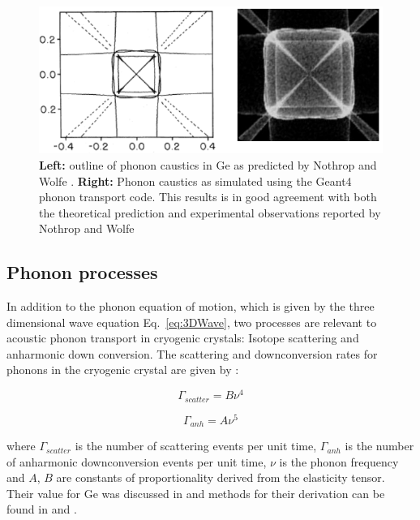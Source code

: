 \documentclass[preprint,12pt]{elsarticle}
\begin{document}
\begin{figure}
	\centering
		\includegraphics[width=1.00\textwidth]{caustics.png}
	\caption{\textbf{Left:} outline of phonon caustics in Ge as predicted by Nothrop and Wolfe \cite{Nothrop}. \textbf{Right:} Phonon caustics as simulated using the Geant4 phonon transport code. This results is in good agreement with both the theoretical prediction and experimental observations reported by Nothrop and Wolfe \cite{Nothrop} }
	\label{fig:caustics}
\end{figure}

\subsection{Phonon processes}
\label{sec:Processes}

In addition to the phonon equation of motion, which is given by the three dimensional wave equation Eq.~\ref{eq:3DWave}, two processes are relevant to acoustic phonon transport in cryogenic crystals: Isotope scattering and anharmonic down conversion\cite{Tamura1}\cite{Tamura2}\cite{Tamura3}. The scattering and downconversion rates for phonons in the cryogenic crystal are given by \cite{Tamura2}:

\begin{equation}
\label{eq:ScatterRate}
\Gamma_{scatter} = B\nu^4
\end{equation}

\begin{equation}
\label{eq:anhRate}
\Gamma_{anh} = A\nu^5
\end{equation}

where $\Gamma_{scatter}$ is the number of scattering events per unit time, $\Gamma_{anh}$ is the number of anharmonic downconversion events per unit time, $\nu$ is the phonon frequency and $A$, $B$ are constants of proportionality derived from the elasticity tensor. Their value for Ge was discussed in \cite{Brandt} and methods for their derivation can be found in \cite{Tamura1} and \cite{Tamura2}.
\end{document}
